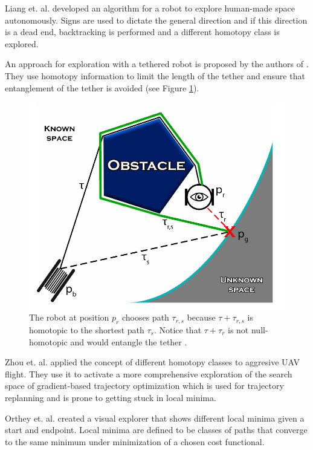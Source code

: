 \documentclass[11pt,twocolumn]{article}
\begin{document}
Liang et. al. \cite{liangHomotopyDrivenExplorationHumanmade2021}
developed an algorithm for a robot to explore human-made space
autonomously. Signs are used to dictate the general direction and if
this direction is a dead end, backtracking is performed and a
different homotopy class is explored.

An approach for exploration with a tethered robot is proposed by the
authors of \cite{shapovalovExplorationUnknownEnvironments2020} . They
use homotopy information to limit the length of the tether and ensure
that entanglement of the tether is avoided (see Figure
\ref{fig:tethered-exploration}).

\begin{figure}[h] \centering
  \includegraphics[scale=.3]{tethered_exploration}
  \caption{The robot at position \(p_{r}\) chooses path
    \(\tau_{r, s}\) because \(\tau + \tau_{r, s}\) is homotopic to the
    shortest path \(\tau_{s}\). Notice that \(\tau + \tau_{r}\) is not
    null-homotopic and would entangle the tether
    \cite{shapovalovExplorationUnknownEnvironments2020}.}
  \label{fig:tethered-exploration}
\end{figure}

Zhou et. al. \cite{zhouRobustRealtimeUAV2020} applied the concept of
different homotopy classes to aggresive UAV flight. They use it to
activate a more comprehensive exploration of the search space of
gradient-based trajectory optimization which is used for trajectory
replanning and is prone to getting stuck in local minima.

Orthey et. al. \cite{ortheyMotionPlanningExplorer2020} created a
visual explorer that shows different local minima given a start and
endpoint. Local minima are defined to be classes of paths that
converge to the same minimum under minimization of a chosen cost
functional.
\end{document}
